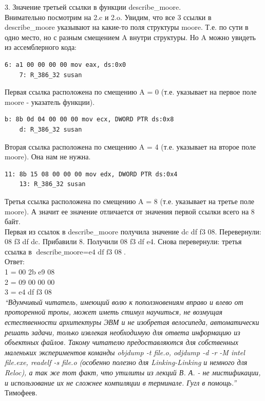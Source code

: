 \documentclass[12pt, letterpaper]{article}
\begin{document}
3. Значение третьей ссылки в функции describe\_moore.\\

Внимательно посмотрим на 2.c и 2.o. Увидим, что все 3 ссылки в describe\_moore указывают на какие-то поля структуры moore. Т.е. по сути в одно место, но с разным смещением A внутри структуры. Но A можно увидеть из ассемблерного кода:
\begin{verbatim}
6: a1 00 00 00 00 mov eax, ds:0x0
    7: R_386_32 susan
\end{verbatim}
Первая ссылка расположена по смещению A = 0 (т.е. указывает на первое поле moore - указатель функции).
\begin{verbatim}
b: 8b 0d 04 00 00 00 mov ecx, DWORD PTR ds:0x8
    d: R_386_32 susan
\end{verbatim}
Вторая ссылка расположена по смещению A = 4 (т.е. указывает на второе поле moore). Она нам не нужна.
\begin{verbatim}
11: 8b 15 08 00 00 00 mov edx, DWORD PTR ds:0x4
    13: R_386_32 susan
\end{verbatim}
Третья ссылка расположена по смещению A = 8 (т.е. указывает на третье поле moore). А значит ее значение отличается от значения первой ссылки всего на 8 байт.\\
Первая из ссылок в describe\_moore получила значение dc df f3 08. Перевернули: 08 f3 df dc. Прибавили 8. Получили 08 f3 df e4. Снова перевернули: третья ссылка в $\text{describe\_moore} = \text{e4 df f3 08}$.\\
Ответ:\\
1 = 00 2b e9 08\\
2 = 09 00 00 00\\
3 = e4 df f3 08\\

\textit{``Вдумчивый читатель, имеющий волю к поползновениям вправо и влево от проторенной тропы, может иметь стимул научиться, не возмущая естественности архитектуры ЭВМ и не изобретая велосипеда, автоматически решать задачи, только извлекая необходимую для ответа информацию из объектных файлов. Такому читателю предоставляются для собственных маленьких экспериментов команды objdump -t file.o, odjdump -d -r -M intel file.exe, readelf -s file.o (особенно полезно для Linking-Linking и немного для Reloc), а так же тот факт, что утилиты из лекций В. А. - не мистификации, и использование их не сложнее компиляции в терминале. 
Гугл в помощь.''}\\ \indent \indent \indent \indent \indent \indent \indent \indent \indent \indent \indent \indent \indent \indent \indent \indent \indent {} Тимофеев.
\newpage
\end{document}
